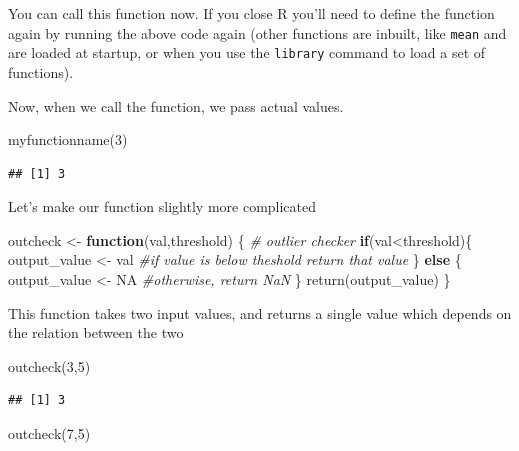 \documentclass[
]{book}
\newenvironment{Shaded}{\begin{snugshade}}{\end{snugshade}}
\newcommand{\CommentTok}[1]{\textcolor[rgb]{0.56,0.35,0.01}{\textit{#1}}}
\newcommand{\ConstantTok}[1]{\textcolor[rgb]{0.00,0.00,0.00}{#1}}
\newcommand{\ControlFlowTok}[1]{\textcolor[rgb]{0.13,0.29,0.53}{\textbf{#1}}}
\newcommand{\DecValTok}[1]{\textcolor[rgb]{0.00,0.00,0.81}{#1}}
\newcommand{\FunctionTok}[1]{\textcolor[rgb]{0.00,0.00,0.00}{#1}}
\newcommand{\NormalTok}[1]{#1}
\newcommand{\OtherTok}[1]{\textcolor[rgb]{0.56,0.35,0.01}{#1}}
\newcommand{\SpecialCharTok}[1]{\textcolor[rgb]{0.00,0.00,0.00}{#1}}
\begin{document}
You can call this function now. If you close R you'll need to define the function again by running the above code again (other functions are inbuilt, like \texttt{mean} and are loaded at startup, or when you use the \texttt{library} command to load a set of functions).

Now, when we call the function, we pass actual values.

\begin{Shaded}
\begin{Highlighting}[]
\FunctionTok{myfunctionname}\NormalTok{(}\DecValTok{3}\NormalTok{)}
\end{Highlighting}
\end{Shaded}

\begin{verbatim}
## [1] 3
\end{verbatim}

Let's make our function slightly more complicated

\begin{Shaded}
\begin{Highlighting}[]
\NormalTok{outcheck }\OtherTok{\textless{}{-}} \ControlFlowTok{function}\NormalTok{(val,threshold) \{}
\CommentTok{\# outlier checker}
\ControlFlowTok{if}\NormalTok{(val}\SpecialCharTok{\textless{}}\NormalTok{threshold)\{}
\NormalTok{  output\_value }\OtherTok{\textless{}{-}}\NormalTok{ val }\CommentTok{\#if value is below theshold return that value}
\NormalTok{\} }\ControlFlowTok{else}\NormalTok{ \{}
\NormalTok{  output\_value }\OtherTok{\textless{}{-}} \ConstantTok{NA} \CommentTok{\#otherwise, return NaN}
\NormalTok{\}}
\FunctionTok{return}\NormalTok{(output\_value)}
\NormalTok{\}}
\end{Highlighting}
\end{Shaded}

This function takes two input values, and returns a single value which depends on the relation between the two

\begin{Shaded}
\begin{Highlighting}[]
\FunctionTok{outcheck}\NormalTok{(}\DecValTok{3}\NormalTok{,}\DecValTok{5}\NormalTok{)}
\end{Highlighting}
\end{Shaded}

\begin{verbatim}
## [1] 3
\end{verbatim}

\begin{Shaded}
\begin{Highlighting}[]
\FunctionTok{outcheck}\NormalTok{(}\DecValTok{7}\NormalTok{,}\DecValTok{5}\NormalTok{)}
\end{Highlighting}
\end{Shaded}
\end{document}
